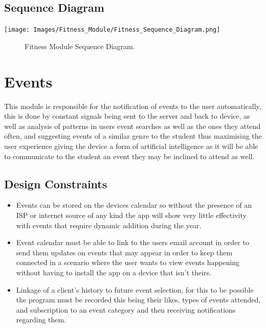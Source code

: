 \documentclass[a4paper, 12pt, one column]{article}
\begin{document}
\subsection{Sequence Diagram}
        \texttt{[image: Images/Fitness\_Module/Fitness\_Sequence\_Diagram.png]}
        \begin{figure}[h]
            \caption{Fitness Module Sequence Diagram.}
        \end{figure}
        
\newpage
\section{Events}
This module is responsible for the notification of events to the user automatically, this is done by constant signals being sent to the server and back to device, as well as analysis of patterns in users event searches as well as the ones they attend often, and suggesting events of a similar genre to the student thus maximising the user experience giving the device a form of artificial intelligence as it will be able to communicate to the student an event they may be inclined to attend as well.

\subsection{Design Constraints}
\begin{itemize}

      \item Events can be stored on the devices calendar so without the presence of an ISP or internet source
  of any kind the app will show very little effectivity with events that require dynamic addition during
  the year.
      \item Event calendar must be able to link to the users email account in order to send them updates on events
  that may appear in order to keep them connected in a scenario where the user wants to view events happening 
  without having to install the app on a device that isn’t theirs.
      \item Linkage of a client’s history to future event selection, for this to be possible the program must be 
  recorded this being their likes, types of events attended, and subscription to an event category and 
  then receiving notifications regarding them.
      
\end{itemize}
\end{document}
